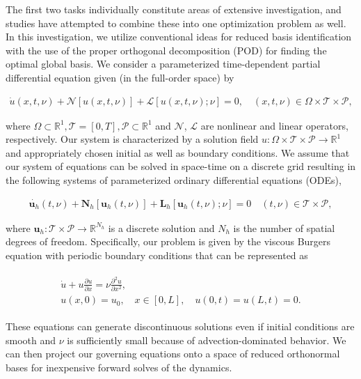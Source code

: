 \documentclass[preprint,12pt]{elsarticle}
\begin{document}
The first two tasks individually constitute areas of extensive investigation, and  studies have attempted to combine these into one optimization problem as well. In this investigation, we utilize conventional ideas for reduced basis identification with the use of the proper orthogonal decomposition (POD) for finding the optimal global basis. We consider a parameterized time-dependent partial differential equation given (in the full-order space) by
\begin{linenomath*}
\begin{align}
\label{gen1}
\dot{u}(x,t,\nu) + \mathcal{N}[u(x,t,\nu)] + \mathcal{L}[u(x,t,\nu); \nu] = 0, \quad (x,t,\nu) \in \Omega \times \mathcal{T} \times \mathcal{P},
\end{align}
\end{linenomath*}
where $\Omega \subset \mathbb{R}^1, \mathcal{T} = [0,T], \mathcal{P} \subset \mathbb{R}^1$ and $\mathcal{N}$, $\mathcal{L}$ are nonlinear and linear operators, respectively. Our system is characterized by a solution field $u : \Omega \times \mathcal{T} \times \mathcal{P} \rightarrow \mathbb{R}^1$ and appropriately chosen initial as well as boundary conditions.  We assume that our system of equations can be solved in space-time on a discrete grid resulting in the following systems of parameterized ordinary differential equations (ODEs), 
\begin{linenomath*}
\begin{align}
\dot{\mathbf{u}_h}(t,\nu) + \mathbf{N}_{h}[\mathbf{u}_h(t,\nu)] + \mathbf{L}_h[\mathbf{u}_h(t,\nu); \nu] = 0  \quad(t,\nu) \in \mathcal{T} \times \mathcal{P},
\end{align}
\end{linenomath*}
where $\mathbf{u}_h : \mathcal{T} \times \mathcal{P} \rightarrow \mathbb{R}^{N_h}$ is a discrete solution and $N_h$ is the number of spatial degrees of freedom. Specifically, our problem is given by the viscous Burgers equation with periodic boundary conditions that can be represented as
\begin{linenomath*}
\begin{align}
\begin{gathered}
\label{gen3}
\dot{u} + u\frac{\partial u}{\partial x} = \nu \frac{\partial^2 u}{\partial x^2}, \\
u(x,0) = u_0, \quad x \in [0,L], \quad u(0,t) = u(L,t) = 0.
\end{gathered}
\end{align}
\end{linenomath*}
These equations can generate discontinuous solutions even if initial conditions are smooth and $\nu$ is sufficiently small because of advection-dominated behavior. We can then  project our governing equations onto a space of reduced orthonormal bases for inexpensive forward solves of the dynamics. 
\end{document}
